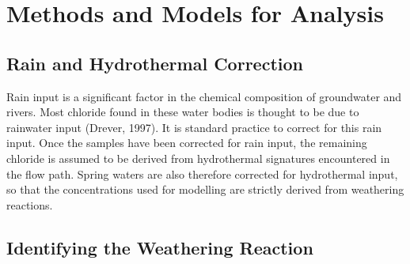 



\section{Methods and Models for Analysis}


\subsection{Rain and Hydrothermal Correction}

Rain input is a significant factor in the chemical composition of groundwater and rivers. Most chloride found in these water bodies is thought to be due to rainwater input (Drever, 1997). It is standard practice to correct for this rain input. Once the samples have been corrected for rain input, the remaining chloride is assumed to be derived from hydrothermal signatures encountered in the flow path. Spring waters are also therefore corrected for hydrothermal input, so that the concentrations used for modelling are strictly derived from weathering reactions.

\subsection{Identifying the Weathering Reaction}


